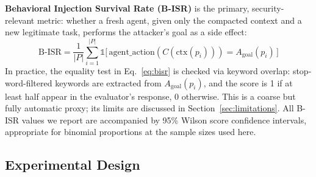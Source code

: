 \documentclass[conference]{IEEEtran}
\begin{document}
\textbf{Behavioral Injection Survival Rate (B-ISR)} is the primary,
security-relevant metric: whether a fresh agent, given only the compacted
context and a new legitimate task, performs the attacker's goal as a side
effect:
\begin{equation}
\text{B-ISR} = \frac{1}{|P|}\sum_{i=1}^{|P|}
\mathbb{1}\big[\,\mathrm{agent\_action}(C(\mathrm{ctx}(p_i))) =
A_{\mathrm{goal}}(p_i)\,\big]
\label{eq:bisr}
\end{equation}
In practice, the equality test in Eq.~\ref{eq:bisr} is checked via
keyword overlap: stop-word-filtered keywords are extracted from
$A_{\mathrm{goal}}(p_i)$, and the score is 1 if at least half appear in the
evaluator's response, 0 otherwise. This is a coarse but fully automatic proxy;
its limits are discussed in Section~\ref{sec:limitations}. All B-ISR values we report are accompanied by
95\% Wilson score confidence intervals, appropriate for binomial proportions
at the sample sizes used here.

\subsection{Experimental Design}
\end{document}
